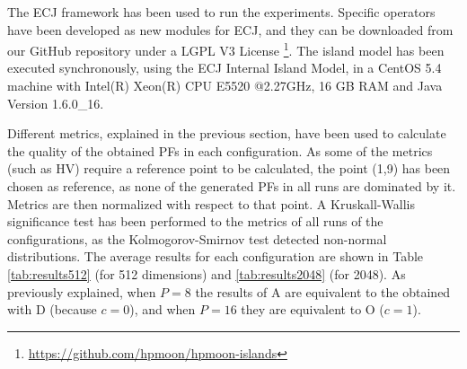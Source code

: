 \documentclass[preprint]{elsarticle}
\begin{document}
The ECJ framework \citep{ECJ} has been used to run the
experiments. Specific operators have been developed as new modules for
ECJ, and they can be downloaded from our GitHub repository under a
LGPL V3 License
\footnote{\url{https://github.com/hpmoon/hpmoon-islands}}. 
The
island model has been executed synchronously, using the ECJ Internal
Island Model, in a CentOS 5.4 machine with Intel(R) Xeon(R) CPU E5520
@2.27GHz, 16 GB RAM and Java Version 1.6.0\_16.


Different metrics, explained in the previous section, have been used
to calculate the quality of the obtained PFs in each configuration. As
some of the metrics  (such as HV) require a reference point to be
calculated, the point (1,9) has been chosen as reference, as none of
the generated PFs in all runs are dominated by it. Metrics are then
normalized with respect to that point. A Kruskall-Wallis significance
test has been performed to the metrics of all runs of the
configurations, as the Kolmogorov-Smirnov test detected non-normal
distributions. The average results for each configuration are shown in
Table \ref{tab:results512} (for 512 dimensions) and
\ref{tab:results2048} (for 2048). As previously explained, when $P=8$
the results of A are equivalent to the obtained with D (because
$c=0$), and when $P=16$ they are equivalent to O ($c=1$). 
\end{document}
